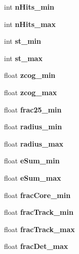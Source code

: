 \begin{DoxyCompactItemize}
\item 
int {\bfseries n\-Hits\-\_\-min}\label{classCALICE_1_1IDCuts_a0491c69f8b69569c0bbceee2ee6cee0c}

\item 
int {\bfseries n\-Hits\-\_\-max}\label{classCALICE_1_1IDCuts_a68726fcd7ca32bed37e0493adf4583e6}

\item 
int {\bfseries st\-\_\-min}\label{classCALICE_1_1IDCuts_a0b027960cbb021a7ea3a43e71fc88930}

\item 
int {\bfseries st\-\_\-max}\label{classCALICE_1_1IDCuts_ab56722bbc30f0de3d6ad020503b25d3e}

\item 
float {\bfseries zcog\-\_\-min}\label{classCALICE_1_1IDCuts_a1e41d0936a329f40f8c7b20f96840613}

\item 
float {\bfseries zcog\-\_\-max}\label{classCALICE_1_1IDCuts_afe14c8654ff47abadafe405cd8082ebd}

\item 
float {\bfseries frac25\-\_\-min}\label{classCALICE_1_1IDCuts_a8dc5df1c44c4d180dfb1e4dcad46d718}

\item 
float {\bfseries radius\-\_\-min}\label{classCALICE_1_1IDCuts_a7d05043260b7a38f51d04c05bc70fb2b}

\item 
float {\bfseries radius\-\_\-max}\label{classCALICE_1_1IDCuts_a048699c3cefc5d0afd46fe59f2e5d874}

\item 
float {\bfseries e\-Sum\-\_\-min}\label{classCALICE_1_1IDCuts_aee1ce3f833cb80a1b09d64718354251d}

\item 
float {\bfseries e\-Sum\-\_\-max}\label{classCALICE_1_1IDCuts_a472d904dbc4ffe7471c13c68e719b4f3}

\item 
float {\bfseries frac\-Core\-\_\-min}\label{classCALICE_1_1IDCuts_a37c80ce119e3a396fb26218f256f748f}

\item 
float {\bfseries frac\-Track\-\_\-min}\label{classCALICE_1_1IDCuts_abb05cf9ecf4c00e1c28223c319405a3f}

\item 
float {\bfseries frac\-Track\-\_\-max}\label{classCALICE_1_1IDCuts_a117c796951d9eec10e1ae534719c07ee}

\item 
float {\bfseries frac\-Det\-\_\-max}\label{classCALICE_1_1IDCuts_ad97f91256cba2100e451ac23c330cb04}

\end{DoxyCompactItemize}


